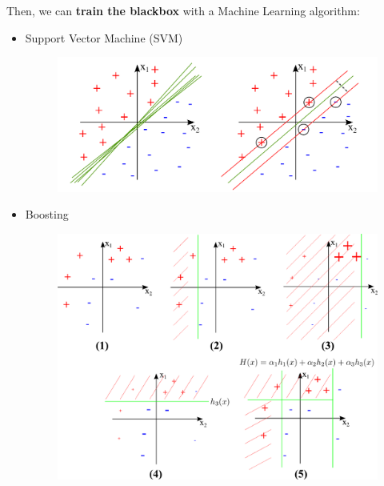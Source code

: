 \documentclass{beamer}[10pt, usepdftitle=false, handout]
\begin{document}
    \begin{frame}
	
	Then, we can \textbf{train the blackbox} with a Machine Learning algorithm:
	\vspace*{1em}
	\begin{itemize}
	\item{Support Vector Machine (SVM)
	\begin{figure}
		\includegraphics[scale=0.28]{19.png} 
	\end{figure}
	
	}
	\item{Boosting 
	\begin{figure}
		\includegraphics[scale=0.35]{20.png} 
	\end{figure}
	
	}
	\end{itemize}		
	
	\end{frame} 
        
\end{document}

